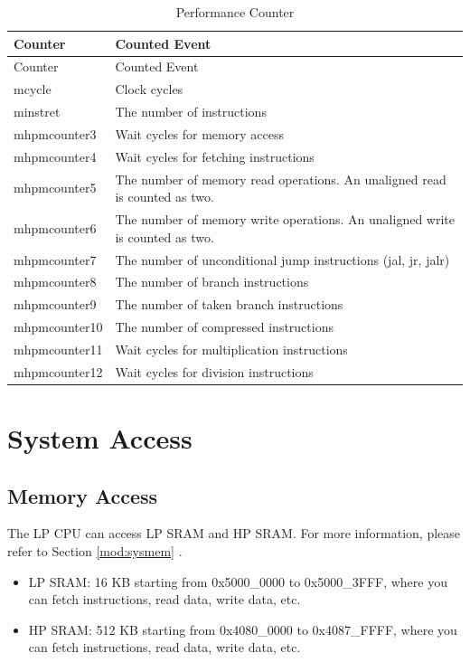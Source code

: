 \documentclass[main\_\_EN.tex]{subfiles}
\begin{document}
\begin{longtable}[c]{|l|l|}
    \caption{Performance Counter}\label{tab:ulp-pccr}\\\hline
    \rowcolor{lightgray}
    Counter & Counted Event \\\hline
    \endfirsthead
    \hline
    \rowcolor{lightgray}
    Counter & Counted Event \\\hline
    \endhead
    \endfoot

    mcycle & Clock cycles \\\hline
    minstret & The number of instructions \\\hline
    mhpmcounter3 & Wait cycles for memory access \\\hline
    mhpmcounter4 & Wait cycles for fetching instructions \\\hline
    mhpmcounter5 & The number of memory read operations. An unaligned read is counted as two.  \\\hline

    mhpmcounter6 & The number of memory write operations. An unaligned write is counted as two. \\\hline
    mhpmcounter7 & The number of unconditional jump instructions (jal, jr, jalr) \\\hline
    mhpmcounter8 & The number of branch instructions \\\hline
    mhpmcounter9 &  The number of taken branch instructions \\\hline
    mhpmcounter10 & The number of compressed instructions \\\hline
    mhpmcounter11 & Wait cycles for multiplication instructions \\\hline
    mhpmcounter12 & Wait cycles for division instructions \\\hline

\end{longtable}

\section{System Access}


\subsection{Memory Access}

The \chipname{} LP CPU can access LP SRAM and HP SRAM. For more information, please refer to Section \ref{mod:sysmem} \textit{}.
\begin{itemize}
    \item LP SRAM: 16 KB starting from 0x5000\_0000 to 0x5000\_3FFF, where you can fetch instructions, read data, write data, etc.
    \item HP SRAM: 512 KB starting from 0x4080\_0000 to 0x4087\_FFFF, where you can fetch instructions, read data, write data, etc.
\end{itemize}
\end{document}
